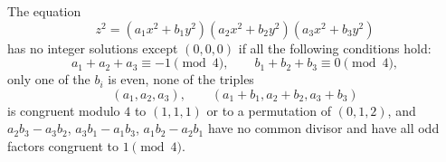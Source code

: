 \begin{proposition}
    The equation
\[
    z^2=(a_1x^2+b_1y^2)(a_2x^2+b_2y^2)(a_3x^2+b_3y^2)
\]
    has no integer solutions except $(0,0,0)$ if all the following conditions hold:
\[
    a_1+a_2+a_3\equiv-1\pmod4,\qquad b_1+b_2+b_3\equiv0\pmod4,
\]
    only one of the $b_i$ is even, none of the triples
\[
    (a_1,a_2,a_3),\qquad (a_1+b_1,a_2+b_2,a_3+b_3)
\]
    is congruent modulo $4$ to $(1,1,1)$ or to a permutation of $(0,1,2)$, and $a_2b_3-a_3b_2$, $a_3b_1-a_1b_3$, $a_1b_2-a_2b_1$ have no common divisor and have all odd factors congruent to $1\pmod4$.
\end{proposition}
